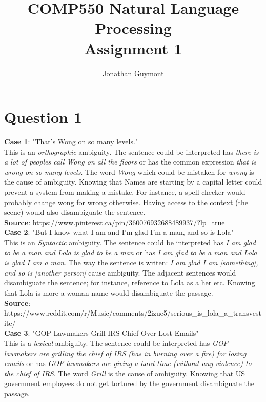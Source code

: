 \documentclass[10pt]{article}
\begin{document}
\title{COMP550 Natural Language Processing\\Assignment 1}
\author{Jonathan Guymont}
\maketitle

\section*{Question 1}
\textbf{Case 1}: "That's Wong on so many levels."\\

This is an \textit{orthographic} ambiguity. The sentence could be interpreted has \textit{there is a lot of peoples call Wong on all the floors} or has the common expression \textit{that is wrong on so many levels}. The word \textit{Wong} which could be mistaken for \textit{wrong} is the cause of ambiguity. Knowing that Names are starting by a capital letter could prevent a system from making a mistake. For instance, a spell checker would probably change wong for wrong otherwise. Having access to the context (the scene) would also disambiguate the sentence. \\

\textbf{Source}: https://www.pinterest.ca/pin/360076932688489937/?lp=true\\

\textbf{Case 2}: "But I know what I am and I'm glad I'm a man, and so is Lola"\\

This is an \textit{Syntactic} ambiguity. The sentence could be interpreted has \textit{I am glad to be a man and Lola is glad to be a man} or has \textit{I am glad to be a man and Lola is glad I am a man}. The way the sentence is writen: \textit{I am glad I am [something], and so is [another person]} cause ambiguity. The adjacent sentences would disambiguate the sentence; for instance, reference to Lola as a her etc. Knowing that Lola is more a woman name would disambiguate the passage.\\

\textbf{Source}: https://www.reddit.com/r/Music/comments/2izue5/serious\_is\_lola\_a\_transvestite/\\

\textbf{Case 3}: "GOP Lawmakers Grill IRS Chief Over Lost Emails"\\

This is a \textit{lexical} ambiguity. The sentence could be interpreted has \textit{GOP lawmakers are grilling the chief of IRS (has in burning over a fire) for losing emails} or has \textit{GOP lawmakers are giving a hard time (without any violence) to the chief of IRS}. The word \textit{Grill} is the cause of ambiguity. Knowing that US government employees do not get tortured by the government disambiguate the passage.\\
\end{document}
